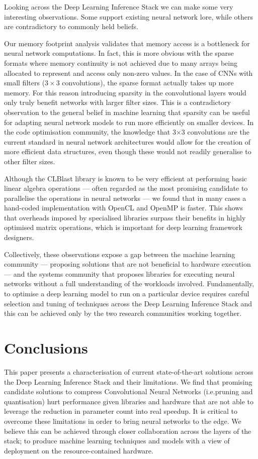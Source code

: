 \documentclass[conference]{IEEEtran}
\begin{document}
Looking across the Deep Learning Inference Stack we can make some very interesting observations. Some support existing neural network lore, while others are contradictory to commonly held beliefs.

Our memory footprint analysis validates that memory access is a bottleneck for neural network computations. In fact, this is more obvious with the sparse formats where memory continuity is not achieved due to many arrays being allocated to represent and access only non-zero values. In the case of CNNs with small filters ($3\times3$ convolutions), the sparse format actually takes up more memory. For this reason introducing sparsity in the convolutional layers would only truly benefit networks with larger filter sizes. This is a contradictory observation to the general belief in machine learning that sparsity can be useful for adapting neural network models to run more efficiently on smaller devices. In the code optimisation community, the knowledge that 3$\times$3 convolutions are the current standard in neural network architectures would allow for the creation of more efficient data structures, even though these would not readily generalise to other filter sizes.

Although the CLBlast library is known to be very efficient at performing basic linear algebra operations --- often regarded as the most promising candidate to parallelise the operations in neural networks --- we found that in many cases a hand-coded implementation with OpenCL and OpenMP is faster. This shows that overheads imposed by specialised libraries surpass their benefits in highly optimised matrix operations, which is important for deep learning framework designers.

Collectively, these observations expose a gap between the machine learning community --- proposing solutions that are not beneficial to hardware execution --- and the systems community that proposes libraries for executing neural networks without a full understanding of the workloads involved. Fundamentally, to optimise a deep learning model to run on a particular device requires careful selection and tuning of techniques across the Deep Learning Inference Stack and this can be achieved only by the two research communities working together. 

\section{Conclusions}

This paper presents a characterisation of current state-of-the-art solutions across the Deep Learning Inference Stack and their limitations. We find that promising candidate solutions to compress Convolutional Neural Networks (i.e.\weight pruning and quantisation) hurt performance given libraries and hardware that are not able to leverage the reduction in parameter count into real speedup. It is critical to overcome these limitations in order to bring neural networks to the edge. We believe this can be achieved through closer collaboration across the layers of the stack; to produce machine learning techniques and models with a view of deployment on the resource-contained hardware.
\end{document}
